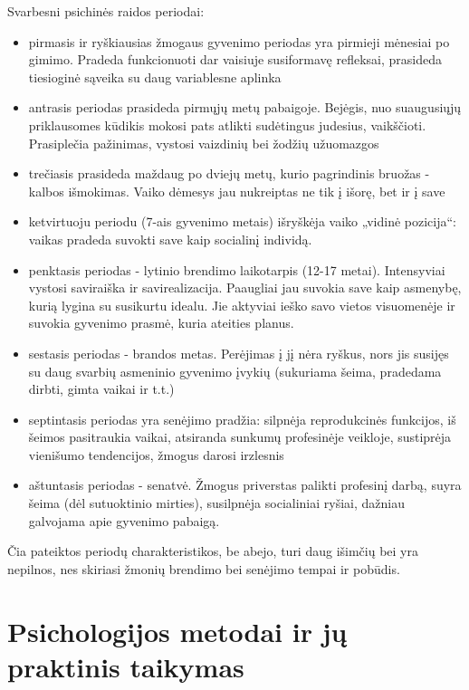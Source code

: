 Svarbesni psichinės raidos periodai:
\begin{itemize}
  \item pirmasis ir ryškiausias žmogaus gyvenimo periodas yra pirmieji 
  mėnesiai po gimimo. Pradeda funkcionuoti dar vaisiuje susiformavę 
  refleksai, prasideda tiesioginė sąveika su daug variablesne aplinka
  \item antrasis periodas prasideda pirmųjų metų pabaigoje. Bejėgis, nuo
  suaugusiųjų priklausomes kūdikis mokosi pats atlikti sudėtingus judesius,
  vaikščioti. Prasiplečia pažinimas, vystosi vaizdinių bei žodžių užuomazgos
  \item trečiasis prasideda maždaug po dviejų metų, kurio pagrindinis 
  bruožas - kalbos išmokimas. Vaiko dėmesys jau nukreiptas ne tik į išorę,
  bet ir į save
  \item ketvirtuoju periodu (7-ais gyvenimo metais) išryškėja vaiko „vidinė
  pozicija“: vaikas pradeda suvokti save kaip socialinį individą.
  \item penktasis periodas - lytinio brendimo laikotarpis (12-17 metai).
  Intensyviai vystosi saviraiška ir savirealizacija. Paaugliai jau suvokia 
  save kaip asmenybę, kurią lygina su susikurtu idealu. Jie aktyviai
  ieško savo vietos visuomenėje ir suvokia gyvenimo prasmė, kuria ateities
  planus.
  \item sestasis periodas - brandos metas. Perėjimas į jį nėra ryškus, nors 
  jis susijęs su daug svarbių asmeninio gyvenimo įvykių (sukuriama šeima,
  pradedama dirbti, gimta vaikai ir t.t.)
  \item septintasis periodas yra senėjimo pradžia: silpnėja reprodukcinės 
  funkcijos, iš šeimos pasitraukia vaikai, atsiranda sunkumų profesinėje 
  veikloje, sustiprėja vienišumo tendencijos, žmogus darosi irzlesnis
  \item aštuntasis periodas - senatvė. Žmogus priverstas palikti profesinį
  darbą, suyra šeima (dėl sutuoktinio mirties), susilpnėja socialiniai ryšiai,
  dažniau galvojama apie gyvenimo pabaigą.
\end{itemize}

Čia pateiktos periodų charakteristikos, be abejo, turi daug išimčių bei yra 
nepilnos, nes skiriasi žmonių brendimo bei senėjimo tempai ir pobūdis.

\section{Psichologijos metodai ir jų praktinis taikymas}

